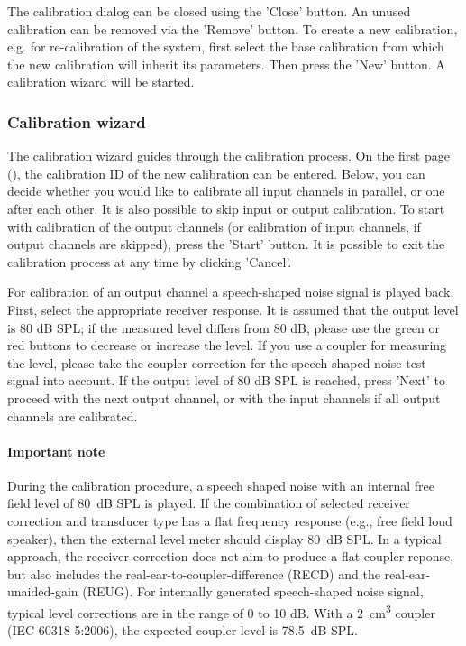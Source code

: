 \documentclass[11pt,a4paper,twoside]{article}
\begin{document}
The calibration dialog can be closed using the 'Close' button.
%
An unused calibration can be removed via the 'Remove' button.
%
To create a new calibration, e.g. for re-calibration of the system,
first select the base calibration from which the new calibration will
inherit its parameters.
%
Then press the 'New' button.
%
A calibration wizard will be started.


\subsubsection*{Calibration wizard}

The calibration wizard guides through the calibration process.
%
On the first page (), the
calibration ID of the new calibration can be entered.
%
Below, you can decide whether you would like to calibrate all input
channels in parallel, or one after each other.
%
It is also possible to skip input or output calibration.
%
To start with calibration of the output channels (or calibration of
input channels, if output channels are skipped), press the 'Start'
button.
%
It is possible to exit the calibration process at any time by clicking
'Cancel'.


For calibration of an output channel a speech-shaped noise signal is
played back.
%
First, select the appropriate receiver response.
%
It is assumed that the output level is 80 dB SPL; if the measured
level differs from 80 dB, please use the green or red buttons to
decrease or increase the level.
%
If you use a coupler for measuring the level, please take the coupler
correction for the speech shaped noise test signal into account.
%
If the output level of 80 dB SPL is reached, press 'Next' to proceed
with the next output channel, or with the input channels if all output
channels are calibrated.

\paragraph{Important note}
%
During the calibration procedure, a speech shaped noise with an
internal free field level of 80~dB SPL is played.
%
If the combination of selected receiver correction and transducer type has a flat frequency response (e.g., free field loud speaker), then the external level meter should display 80~dB SPL.
%
In a typical approach, the receiver correction does not aim to produce
a flat coupler reponse, but also includes the
real-ear-to-coupler-difference (RECD) and the real-ear-unaided-gain
(REUG).
%
For internally generated speech-shaped noise signal, typical level
corrections are in the range of 0 to 10 dB.
%
With a 2~cm\textsuperscript{3} coupler (IEC 60318-5:2006), the expected
coupler level is 78.5~dB SPL.
%
%
\end{document}
